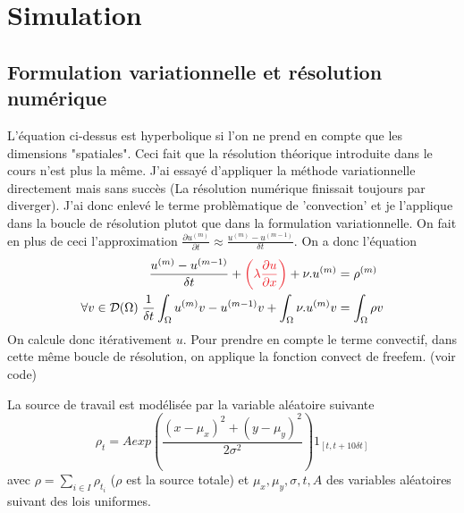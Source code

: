 \documentclass[french]{article}
\begin{document}
    
    \section{Simulation}
    \subsection{Formulation variationnelle et résolution numérique}
    L'équation ci-dessus est hyperbolique si l'on ne prend en compte que les dimensions "spatiales".
    Ceci fait que la résolution théorique introduite dans le cours n'est plus la même. J'ai essayé d'appliquer la méthode
    variationnelle directement mais sans succès (La résolution numérique finissait toujours par diverger). J'ai donc enlevé le terme problèmatique
    de 'convection' et je l'applique dans la boucle de résolution plutot que dans la formulation variationnelle. On fait en plus de ceci l'approximation 
    $\frac{\partial u^{(m)}}{\partial t} \approx \frac{u^{(m)} - u^{(m-1)}}{\delta t}$.
    On a donc l'équation
    \begin{alignat*}{10}
        \frac{u^{(m)} - u^{(m-1)}}{\delta t} + 
        \textcolor{Red}{\left( \lambda\frac{\partial u}{\partial x}\right)} 
        + \nu.u^{(m)} &= \rho^{(m)} \\
        \forall v \in \mathcal{D}(\Omega) \; \frac{1}{\delta t} \int_{\Omega} u^{(m)}v - u^{(m-1)}v + \int_{\Omega} \nu.u^{(m)}v
        &= \int_{\Omega} \rho v
    \end{alignat*}
    On calcule donc itérativement $u$. Pour prendre en compte le terme convectif, dans cette même boucle de résolution, on applique la fonction convect de freefem. (voir code)
    
    La source de travail est modélisée par la variable aléatoire suivante 
    \begin{equation}
        \rho_t = Aexp\left( \frac{(x-\mu_x)^2+(y-\mu_y)^2}{2\sigma^2} \right)1_{[t, t+10\delta t]}
    \end{equation} 
    avec $\rho = \sum_{i\in I} \rho_{t_i}$ ($\rho$ est la source totale) et $\mu_x,\mu_y,\sigma,t,A$ des variables aléatoires suivant des lois uniformes.
\end{document}
